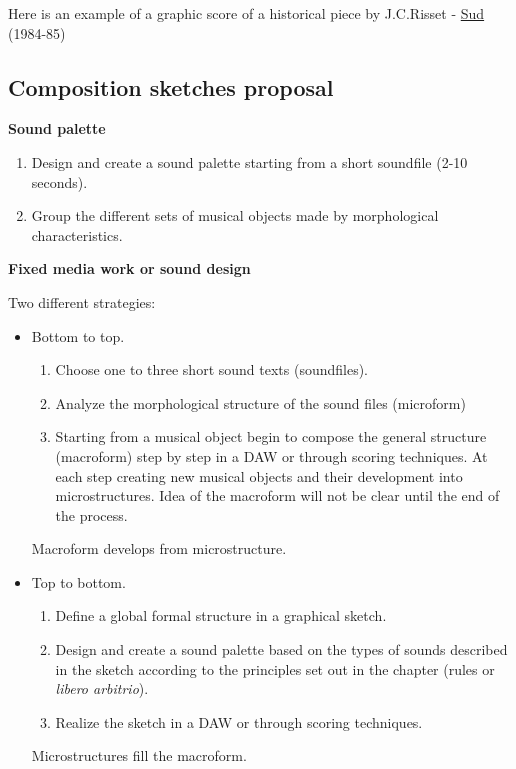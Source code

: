 Here is an example of a graphic score of a historical piece by J.C.Risset - \href{https://github.com/musicaecodice/EMC/blob/main/3_fixed/suoni/risset1.mp4}{Sud} (1984-85)

\subsection{Composition sketches proposal}\label{composition-sketches-proposal}


\textbf{Sound palette}

\begin{enumerate}
\def\labelenumi{\arabic{enumi}.}
\tightlist
\item Design and create a sound palette starting from a short soundfile (2-10 seconds).
\item Group the different sets of musical objects made by morphological characteristics.
\end{enumerate}

\textbf{Fixed media work or sound design}

Two different strategies:

\begin{itemize}

\item Bottom to top.

   \begin{enumerate}
   \def\labelenumi{\arabic{enumi}.}
   \tightlist
   \item Choose one to three short sound texts (soundfiles). 
   \item Analyze the morphological structure of the sound files (microform) 
   \item Starting from a musical object begin to compose the general structure (macroform) step by step in a DAW or through scoring techniques. At each step creating new musical objects and their development into microstructures. Idea of the macroform will not be clear until the end of the process.
  \end{enumerate}
    Macroform develops from microstructure.

\item Top to bottom.

  \begin{enumerate}
  \def\labelenumi{\arabic{enumi}.}
  \tightlist
  \item Define a global formal structure in a graphical sketch.
  \item Design and create a sound palette based on the types of sounds described in the sketch according to the principles set out in the chapter (rules or \textit{libero arbitrio}).
  \item Realize the sketch in a DAW or through scoring techniques.
  \end{enumerate}

  Microstructures fill the macroform.
\end{itemize}